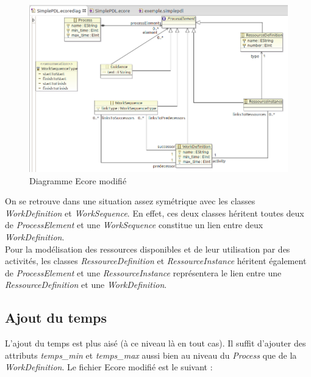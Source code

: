 \documentclass{report}
\begin{document}
\begin{figure}[!h] 
\begin{center}
\includegraphics[width=15cm]{Capture-4.png}
\caption{Diagramme Ecore modifié} 
\label{img1} 
\end{center}
\end{figure} 

On se retrouve dans une situation assez symétrique avec les classes \textit{WorkDefinition} et \textit{WorkSequence}. En effet, ces deux classes héritent toutes deux de \textit{ProcessElement} et une \textit{WorkSequence} constitue un lien entre deux \textit{WorkDefinition}.\\

Pour la modélisation des ressources disponibles et de leur utilisation par des activités, les classes \textit{RessourceDefinition} et \textit{RessourceInstance} héritent également de \textit{ProcessElement} et une \textit{RessourceInstance} représentera le lien entre une \textit{RessourceDefinition} et une \textit{WorkDefinition}.

\subsection{Ajout du temps}

L'ajout du temps est plus aisé (à ce niveau là en tout cas). Il suffit d'ajouter des attributs \textit{temps\_min} et \textit{temps\_max} aussi bien au niveau du \textit{Process} que de la \textit{WorkDefinition}. Le fichier Ecore modifié est le suivant :\\
\end{document}
